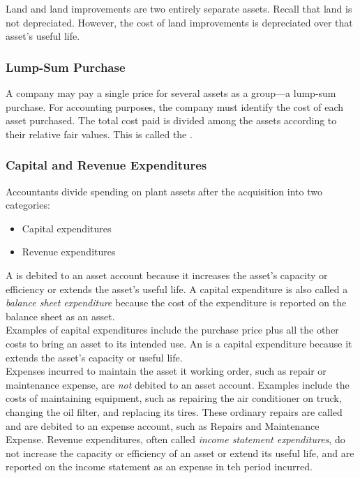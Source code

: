 \documentclass{article}
\begin{document}
Land and land improvements are two entirely separate assets. Recall that land is not depreciated. However, the cost of land improvements is depreciated over that asset's useful life. 

\subsubsection{Lump-Sum Purchase}

A company may pay a single price for several assets as a group---a lump-sum purchase. For accounting purposes, the company must identify the cost of each asset purchased. The total cost paid is divided among the assets according to their relative fair values. This is called the . 

\subsubsection{Capital and Revenue Expenditures}

Accountants divide spending on plant assets after the acquisition into two categories:
\begin{itemize}
  \item Capital expenditures 
  \item Revenue expenditures
\end{itemize}
A  is debited to an asset account because it increases the asset's capacity or efficiency or extends the asset's useful life. A capital expenditure is also called a \emph{balance sheet expenditure} because the cost of the expenditure is reported on the balance sheet as an asset. \\ 

Examples of capital expenditures include the purchase price plus all the other costs to bring an asset to its intended use. An  is a capital expenditure because it extends the asset's capacity or useful life. \\ 

Expenses incurred to maintain the asset it working order, such as repair or maintenance expense, are \emph{not} debited to an asset account. Examples include the costs of maintaining equipment, such as repairing the air conditioner on truck, changing the oil filter, and replacing its tires. These ordinary repairs are called  and are debited to an expense account, such as Repairs and Maintenance Expense. Revenue expenditures, often called \emph{income statement expenditures}, do not increase the capacity or efficiency of an asset or extend its useful life, and are reported on the income statement as an expense in teh period incurred. 
\end{document}
